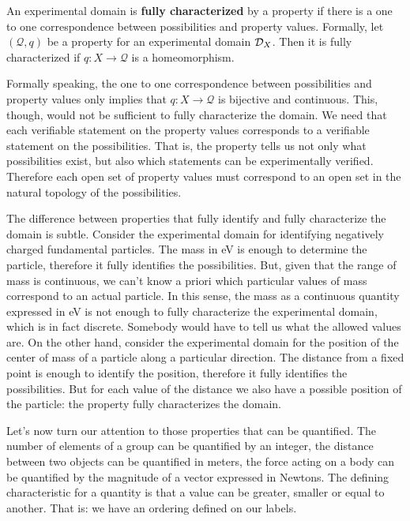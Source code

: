 \documentclass[11pt,letterpaper,fleqn]{memoir} %
\begin{document}
\begin{mathSection}
	\begin{defn}
		An experimental domain is \textbf{fully characterized} by a property if there is a one to one correspondence between possibilities and property values. Formally, let $(\mathcal{Q}, q)$ be a property for an experimental domain $\mathcal{D}_X$. Then it is fully characterized if $q: X \to \mathcal{Q}$ is a homeomorphism.
	\end{defn}

	\begin{justification}
		Formally speaking, the one to one correspondence between possibilities and property values only implies that $q: X \to \mathcal{Q}$ is bijective and continuous. This, though, would not be sufficient to fully characterize the domain. We need that each verifiable statement on the property values corresponds to a verifiable statement on the possibilities. That is, the property tells us not only what possibilities exist, but also which statements can be experimentally verified. Therefore each open set of property values must correspond to an open set in the natural topology of the possibilities.		 
	\end{justification}
\end{mathSection}

The difference between properties that fully identify and fully characterize the domain is subtle. Consider the experimental domain for identifying negatively charged fundamental particles. The mass in eV is enough to determine the particle, therefore it fully identifies the possibilities. But, given that the range of mass is continuous, we can't know a priori which particular values of mass correspond to an actual particle. In this sense, the mass as a continuous quantity expressed in eV is not enough to fully characterize the experimental domain, which is in fact discrete. Somebody would have to tell us what the allowed values are. On the other hand, consider the experimental domain for the position of the center of mass of a particle along a particular direction. The distance from a fixed point is enough to identify the position, therefore it fully identifies the possibilities. But for each value of the distance we also have a possible position of the particle: the property fully characterizes the domain.

Let's now turn our attention to those properties that can be quantified. The number of elements of a group can be quantified by an integer, the distance between two objects can be quantified in meters, the force acting on a body can be quantified by the magnitude of a vector expressed in Newtons. The defining characteristic for a quantity is that a value can be greater, smaller or equal to another. That is: we have an ordering defined on our labels.
	
\end{document}
